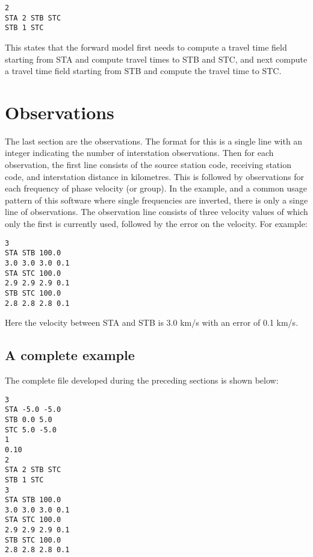 \documentclass[a4paper,12pt]{article}
\begin{document}
\begin{verbatim}
2
STA 2 STB STC
STB 1 STC
\end{verbatim}

This states that the forward model first needs to compute a travel
time field starting from STA and compute travel times to STB and STC,
and next compute a travel time field starting from STB and compute the
travel time to STC.

\section{Observations}

The last section are the observations. The format for this is a single line with an
integer indicating the number of interstation observations. Then for each observation,
the first line consists of the source station code, receiving station code, and interstation
distance in kilometres. This is followed by observations for each frequency of phase velocity
(or group). In the example, and a common usage pattern of this software where single frequencies
are inverted, there is only a singe line of observations. The observation line consists of three velocity
values of which only the first is currently used, followed by the error on the velocity. For example:

\begin{verbatim}
3
STA STB 100.0
3.0 3.0 3.0 0.1
STA STC 100.0
2.9 2.9 2.9 0.1
STB STC 100.0
2.8 2.8 2.8 0.1
\end{verbatim}

Here the velocity between STA and STB is 3.0 km/s with an error of 0.1 km/s.

\subsection{A complete example}

The complete file developed during the preceding sections is shown below:

\begin{verbatim}
3
STA -5.0 -5.0
STB 0.0 5.0
STC 5.0 -5.0
1
0.10
2
STA 2 STB STC
STB 1 STC
3
STA STB 100.0
3.0 3.0 3.0 0.1
STA STC 100.0
2.9 2.9 2.9 0.1
STB STC 100.0
2.8 2.8 2.8 0.1
\end{verbatim}



\end{document}
